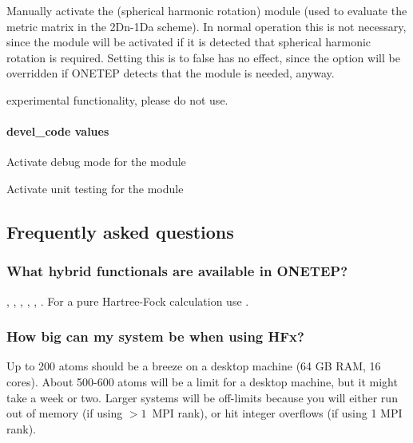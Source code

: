 \documentclass[letterpaper,10pt,english]{sphinxmanual}
\begin{document}
 \textendash{} Manually activate the
 (spherical harmonic rotation) module (used to
evaluate the metric matrix in the 2Dn-1Da scheme). In normal operation
this is not necessary, since the module will be activated if it is
detected that spherical harmonic rotation is required. Setting this is
to false has no effect, since the option will be overridden if ONETEP
detects that the module is needed, anyway.

 \textendash{} experimental functionality, please do not use.


\paragraph{devel\_code values}
\label{\detokenize{hfx:devel-code-values}}
 \textendash{} Activate debug mode for the
 module

 \textendash{} Activate unit testing for the
 module


\subsection{Frequently asked questions}
\label{\detokenize{hfx:frequently-asked-questions}}

\subsubsection{What hybrid functionals are available in ONETEP?}
\label{\detokenize{hfx:what-hybrid-functionals-are-available-in-onetep}}
, , , , , . For a
pure Hartree-Fock calculation use .


\subsubsection{How big can my system be when using HFx?}
\label{\detokenize{hfx:how-big-can-my-system-be-when-using-hfx}}
Up to 200 atoms should be a breeze on a desktop machine (64 GB RAM, 16
cores). About 500-600 atoms will be a limit for a desktop machine, but
it might take a week or two. Larger systems will be off-limits because
you will either run out of memory (if using \(>1\) MPI rank), or hit
 integer overflows (if using 1 MPI rank).
\end{document}
